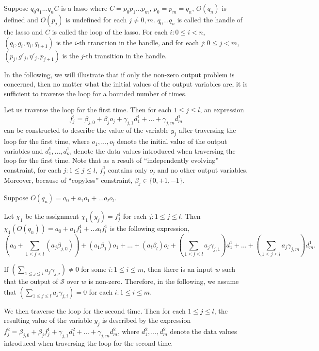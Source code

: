 \documentclass[11pt]{article}
\def\Ss{{\mathcal{S} }}
\begin{document}
Suppose $q_0 q_1 \dots q_n C$ is a lasso where $C=p_0 p_1 \dots p_m$, $p_0 = p_m=q_n$, $O(q_n)$ is defined and $O(p_j)$ is undefined for each $j \neq 0,m$. $q_0 \dots q_n$ is called the handle of the lasso and $C$ is called the loop of the lasso. For each $i: 0 \le i < n$, $(q_i, g_i, \eta_i, q_{i+1})$ is the $i$-th transition in the handle, and for each $j: 0 \le j < m$, $(p_j, g'_j, \eta'_j, p_{j+1})$ is the $j$-th transition in the handle. 

In the following, we will illustrate that if only the non-zero output problem is concerned, then no matter what the initial values of the output variables are, it is sufficient to traverse the loop for a bounded number of times.


Let us traverse the loop for the first time. Then for each $1 \le j \le l$, an expression 
\[f^1_{j} = \beta_{j,0} + \beta_{j} o_{j} + \gamma_{j,1} d^1_1 + \dots + \gamma_{j,m} d^1_m\] 
can be constructed to describe the value of the variable $y_{j}$ after traversing the loop for the first time, where $o_1,\dots,o_l$ denote the initial value of the output variables and $d^1_1, \dots, d^1_m$ denote the data values introduced when traversing the loop for the first time. Note that as a result of ``independently evolving'' constraint, for each $j: 1 \le j \le l$, $f^1_{j}$ contains only $o_{j}$ and no other output variables. Moreover, because of ``copyless'' constraint, $\beta_j \in \{0,+1,-1\}$.

Suppose $O(q_n)=a_0 + a_1 o_1 + \dots a_l o_l$. 

Let $\chi_1$ be the assignment $\chi_1(y_j)=f^1_j$ for each $j: 1\le j \le l$.
Then $\chi_1(O(q_n)) = a_0+ a_1 f^1_1 + \dots a_l f^1_l$ is the following expression,
\[
(a_0 + \sum \limits_{1 \le j \le l} (a_j\beta_{j,0})) +  (a_1 \beta_1) o_1 + \dots + (a_l \beta_l) o_l + (\sum \limits_{1 \le j \le l} a_j \gamma_{j,1}) d^1_1 + \dots + (\sum \limits_{1 \le j \le l} a_j \gamma_{j,m}) d^1_m.
\]

If $(\sum \limits_{1 \le j \le l} a_j \gamma_{j,i}) \neq 0$ for some $i: 1 \le i \le m$, then there is an input $w$ such that the output of $\Ss$ over $w$ is non-zero. Therefore, in the following, we assume that $(\sum \limits_{1 \le j \le l} a_j \gamma_{j,i}) = 0$ for each $i: 1 \le i \le m$.

We then traverse the loop for the second time. Then for each $1 \le j \le l$,  the resulting value of the variable $y_{j}$ is described by the expression $f^2_{j} = \beta_{j,0} + \beta_{j} f^1_{j} + \gamma_{j,1} d^2_1 + \dots + \gamma_{j,m} d^2_m$, where $d^2_1, \dots, d^2_m$ denote the data values introduced when traversing the loop for the second time. 
\end{document}
